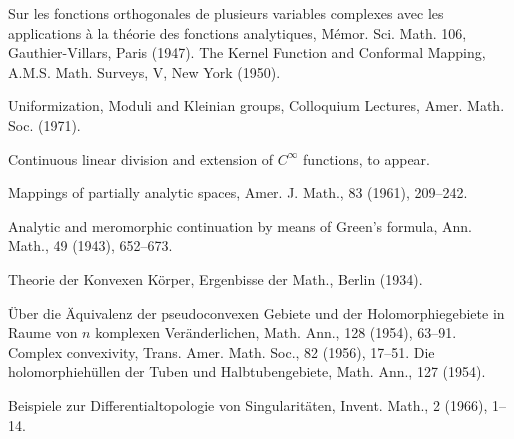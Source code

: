\begin{sourcebibliography}
 Sur les fonctions orthogonales de plusieurs variables complexes avec les applications \`a la th\'eorie des fonctions analytiques, M\'emor. Sci. Math. 106, Gauthier-Villars, Paris (1947).
 The Kernel Function and Conformal Mapping, A.M.S. Math. Surveys, V, New York (1950).
\end{sourcebibliography}
\begin{sourcebibliography}
 Uniformization, Moduli and Kleinian groups, Colloquium Lectures, Amer. Math. Soc. (1971).
\end{sourcebibliography}
\begin{sourcebibliography}
 Continuous linear division and extension of $C^\infty$ functions, to appear.
\end{sourcebibliography}
\begin{sourcebibliography}
 Mappings of partially analytic spaces, Amer. J. Math., 83 (1961), 209--242.
\end{sourcebibliography}
\begin{sourcebibliography}
 Analytic and meromorphic continuation by means of Green's formula, Ann. Math., 49 (1943), 652--673.
\end{sourcebibliography}
\begin{sourcebibliography}
 Theorie der Konvexen K\"orper, Ergenbisse der Math., Berlin (1934).
\end{sourcebibliography}
\begin{sourcebibliography}
 \"Uber die \"Aquivalenz der pseudoconvexen Gebiete und der Holomorphiegebiete in Raume von $n$ komplexen Ver\"anderlichen, Math. Ann., 128 (1954), 63--91.
 Complex convexivity, Trans. Amer. Math. Soc., 82 (1956), 17--51.
 Die holomorphieh\"ullen der Tuben und Halbtubengebiete, Math. Ann., 127 (1954).
\end{sourcebibliography}
\begin{sourcebibliography}
 Beispiele zur Differentialtopologie von Singularit\"aten, Invent. Math., 2 (1966), 1--14.
\end{sourcebibliography}
